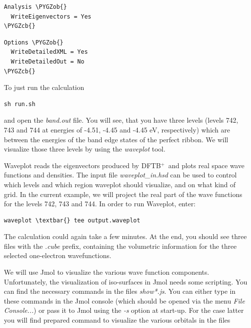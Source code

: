 \documentclass[a4paper,11pt,english]{sphinxmanual}
\newcommand{\dftbp}{\textsf{DFTB$^{\text{+}}$\ }} %
\def\PYGZob{\char`\{}
\def\PYGZcb{\char`\}}
\begin{document}
{{\begin{Verbatim}[commandchars=\\\{\}]
Analysis \PYGZob{}
  WriteEigenvectors = Yes
\PYGZcb{}
\end{Verbatim}

\begin{Verbatim}[commandchars=\\\{\}]
Options \PYGZob{}
  WriteDetailedXML = Yes
  WriteDetailedOut = No
\PYGZcb{}
\end{Verbatim}

To just run the calculation

\begin{Verbatim}[commandchars=\\\{\}]
sh run.sh
\end{Verbatim}

and open the \emph{band.out} file. You will see, that you have three levels
(levels 742, 743 and 744 at energies of -4.51, -4.45 and -4.45 eV,
respectively) which are between the energies of the band edge states
of the perfect ribbon. We will visualize those three levels by using
the \emph{waveplot} tool.

Waveplot reads the eigenvectors produced by \dftbp and plots real space
wave functions and densities. The input file \emph{waveplot\_in.hsd} can be
used to control which levels and which region waveplot should
visualize, and on what kind of grid. In the current example, we will
project the real part of the wave functions for the levels 742, 743
and 744. In order to run Waveplot, enter:

\begin{Verbatim}[commandchars=\\\{\}]
waveplot \textbar{} tee output.waveplot
\end{Verbatim}

The calculation could again take a few minutes. At the end, you should
see three files with the \emph{.cube} prefix, containing the volumetric
information for the three selected one-electron wavefunctions.

We will use Jmol to visualize the various wave function
components. Unfortunately, the visualization of iso-surfaces in Jmol
needs some scripting. You can find the necessary commands in the files
\emph{show*.js}. You can either type in these commands in the Jmol console
(which should be opened via the menu \emph{File \textbar{} Console...}) or pass it
to Jmol using the \emph{-s} option at start-up. For the case latter you
will find prepared command to visualize the various orbitals in the
files

}}
\end{document}
